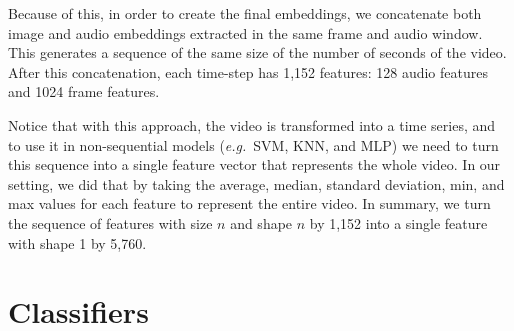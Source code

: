 Because of this, in order to create the final embeddings, we concatenate both image and audio embeddings extracted in the same frame and audio window. This generates a sequence of the same size of the number of seconds of the video. After this concatenation, each time-step has 1,152 features: 128 audio features and 1024 frame features.

Notice that with this approach, the video is transformed into a time series, and to use it in non-sequential models (\textit{e.g.}~SVM, KNN, and MLP) we need to turn this sequence into a single feature vector that represents the whole video. In our setting, we did that by taking the average, median, standard deviation, min, and max values for each feature to represent the entire video. In summary, we turn the sequence of features with size $n$ and shape $n$ by 1,152 into a single feature with shape 1 by 5,760.

\section{Classifiers}
\label{sec:classifiers}


